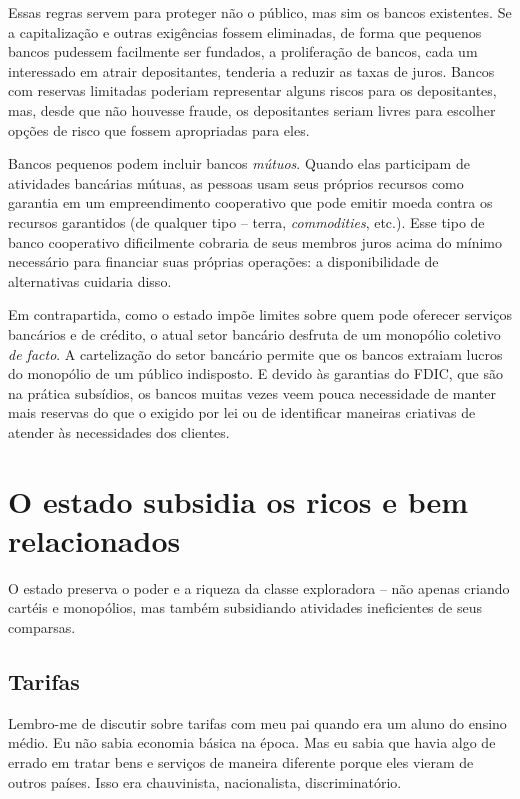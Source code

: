 Essas regras servem para proteger não o público, mas sim os bancos existentes. Se a capitalização e outras exigências fossem eliminadas, de forma que pequenos bancos pudessem facilmente ser fundados, a proliferação de bancos, cada um interessado em atrair depositantes, tenderia a reduzir as taxas de juros. Bancos com reservas limitadas poderiam representar alguns riscos para os depositantes, mas, desde que não houvesse fraude, os depositantes seriam livres para escolher opções de risco que fossem apropriadas para eles.

Bancos pequenos podem incluir bancos \emph{mútuos}. Quando elas participam de atividades bancárias mútuas, as pessoas usam seus próprios recursos como garantia em um empreendimento cooperativo que pode emitir moeda contra os recursos garantidos (de qualquer tipo -- terra, \emph{commodities}, etc.). Esse tipo de banco cooperativo dificilmente cobraria de seus membros juros acima do mínimo necessário para financiar suas próprias operações: a disponibilidade de alternativas cuidaria disso.

Em contrapartida, como o estado impõe limites sobre quem pode oferecer serviços bancários e de crédito, o atual setor bancário desfruta de um monopólio coletivo \emph{de facto}. A cartelização do setor bancário permite que os bancos extraiam lucros do monopólio de um público indisposto. E devido às garantias do FDIC, que são na prática subsídios, os bancos muitas vezes veem pouca necessidade de manter mais reservas do que o exigido por lei ou de identificar maneiras criativas de atender às necessidades dos clientes.

\section{O estado subsidia os ricos e bem relacionados}

O estado preserva o poder e a riqueza da classe exploradora -- não apenas criando cartéis e monopólios, mas também subsidiando atividades ineficientes de seus comparsas.

\subsection*{Tarifas}

Lembro-me de discutir sobre tarifas com meu pai quando era um aluno do ensino médio. Eu não sabia economia básica na época. Mas eu sabia que havia algo de errado em tratar bens e serviços de maneira diferente porque eles vieram de outros países. Isso era chauvinista, nacionalista, discriminatório.

